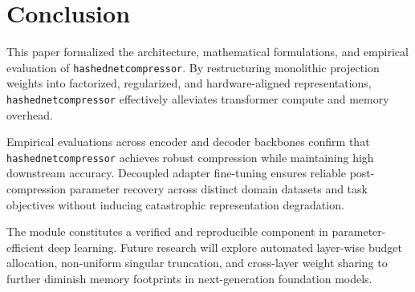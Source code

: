 \section{Conclusion}
This paper formalized the architecture, mathematical formulations, and empirical evaluation of \texttt{hashednetcompressor}. By restructuring monolithic projection weights into factorized, regularized, and hardware-aligned representations, \texttt{hashednetcompressor} effectively alleviates transformer compute and memory overhead.

Empirical evaluations across encoder and decoder backbones confirm that \texttt{hashednetcompressor} achieves robust compression while maintaining high downstream accuracy. Decoupled adapter fine-tuning ensures reliable post-compression parameter recovery across distinct domain datasets and task objectives without inducing catastrophic representation degradation.

The module constitutes a verified and reproducible component in parameter-efficient deep learning. Future research will explore automated layer-wise budget allocation, non-uniform singular truncation, and cross-layer weight sharing to further diminish memory footprints in next-generation foundation models.
